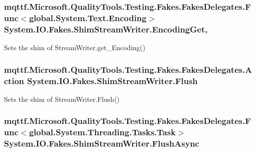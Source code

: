 \hypertarget{class_system_1_1_i_o_1_1_fakes_1_1_shim_stream_writer_a4a64bdebe282a680b10bd1d600ce4bd2}{
\subsubsection[{Encoding\-Get}]{\setlength{\rightskip}{0pt plus 5cm}mqttf.\-Microsoft.\-Quality\-Tools.\-Testing.\-Fakes.\-Fakes\-Delegates.\-Func$<$global.\-System.\-Text.\-Encoding$>$ System.\-I\-O.\-Fakes.\-Shim\-Stream\-Writer.\-Encoding\-Get\hspace{0.3cm}{\ttfamily [get]}, {\ttfamily [set]}}}\label{class_system_1_1_i_o_1_1_fakes_1_1_shim_stream_writer_a4a64bdebe282a680b10bd1d600ce4bd2}


Sets the shim of Stream\-Writer.\-get\-\_\-\-Encoding()

\hypertarget{class_system_1_1_i_o_1_1_fakes_1_1_shim_stream_writer_a044d3646bb63c8853ac06d206168b01b}{
\subsubsection[{Flush}]{\setlength{\rightskip}{0pt plus 5cm}mqttf.\-Microsoft.\-Quality\-Tools.\-Testing.\-Fakes.\-Fakes\-Delegates.\-Action System.\-I\-O.\-Fakes.\-Shim\-Stream\-Writer.\-Flush\hspace{0.3cm}{\ttfamily [set]}}}\label{class_system_1_1_i_o_1_1_fakes_1_1_shim_stream_writer_a044d3646bb63c8853ac06d206168b01b}


Sets the shim of Stream\-Writer.\-Flush()

\hypertarget{class_system_1_1_i_o_1_1_fakes_1_1_shim_stream_writer_a47d5203e93e477a9a2b21808c17503b2}{
\subsubsection[{Flush\-Async}]{\setlength{\rightskip}{0pt plus 5cm}mqttf.\-Microsoft.\-Quality\-Tools.\-Testing.\-Fakes.\-Fakes\-Delegates.\-Func$<$global.\-System.\-Threading.\-Tasks.\-Task$>$ System.\-I\-O.\-Fakes.\-Shim\-Stream\-Writer.\-Flush\-Async\hspace{0.3cm}{\ttfamily [set]}}}\label{class_system_1_1_i_o_1_1_fakes_1_1_shim_stream_writer_a47d5203e93e477a9a2b21808c17503b2}


